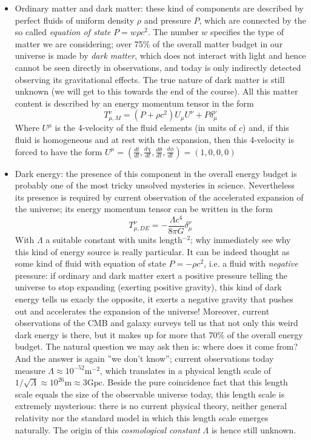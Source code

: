 \documentclass[11pt, a4paper,oneside,openright]{book}
\numberwithin{equation}{section}
\begin{document}
\begin{itemize}
\item Ordinary matter and dark matter: these kind of components are described by perfect fluids of uniform density $\rho$ and pressure $P$, which are connected by the so called \textit{equation of state} $P=w\rho c^2$. The number $w$ specifies the type of matter we are considering; over 75\% of the overall matter budget in our universe is made by \textit{dark matter}, which does not interact with light and hence cannot be seen directly in observations, and today is only indirectly detected observing its gravitational effects. The true nature of dark matter is still unknown (we will get to this towards the end of the course). All this matter content is described by an energy momentum tensor in the form 
\begin{equation}
T_{\mu,M}^\nu=(P+\rho c^2)U_\mu U^\nu + P\delta_\mu ^ \nu
\end{equation} 
Where $U^\mu$ is the 4-velocity of the fluid elements (in units of $c$) and, if this fluid is homogeneous and at rest with the expansion, then this 4-velocity is forced to have the form $U^\mu=\left(\frac{dt}{dt},\frac{d\chi}{dt},\frac{d\theta}{dt},\frac{d\phi}{dt}\right)=(1,0,0,0)$
\item Dark energy: the presence of this component in the overall energy budget is probably one of the most tricky unsolved mysteries in science. Nevertheless its presence is required by current observation of the accelerated expansion of the universe; its energy momentum tensor can be written in the form
\begin{equation}
T_{\mu,DE}^\nu=-\frac{\Lambda c^4}{8\pi G}\delta_\mu^\nu
\end{equation}
With $\Lambda$ a suitable constant with units length$^{-2}$; why immediately see why this kind of energy source is really particular. It can be indeed thought as some kind of fluid with equation of state $P=-\rho c^2$, i.e. a fluid with \textit{negative} pressure: if ordinary and dark matter exert a positive pressure telling the universe to stop expanding (exerting positive gravity), this kind of dark energy tells us exacly the opposite, it exerts a negative gravity that pushes out and accelerates the expansion of the universe! Moreover, current observations of the CMB and galaxy surveys tell us that not only this weird dark energy is there, but it makes up for more that 70\% of the overall energy budget. The natural question we may ask then is: where does it come from? And the answer is again ''we don't know''; current observations today measure $\Lambda \approx 10^{-52}\mathrm{m}^{-2}$, which translates in a physical length scale of $1/\sqrt{\Lambda}\approx 10^{26}\mathrm{m}\approx 3\mathrm{Gpc}$. Beside 
the pure coincidence fact that this length scale equals the size of the observable universe today, this length scale is extremely mysterious: there is no current physical theory, neither general relativity nor the standard model in which this length scale emerges naturally. The origin of this \textit{cosmological constant} $\Lambda$ is hence still unknown. 
\end{itemize}
\end{document}
